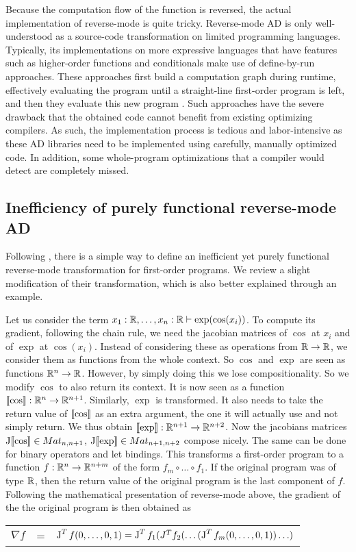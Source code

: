 Because the computation flow of the function is reversed, the actual implementation of reverse-mode is quite tricky. 
Reverse-mode AD is only well-understood as a source-code transformation on limited programming languages. 
Typically, its implementations on more expressive languages that have features such as higher-order functions and conditionals
make use of define-by-run approaches. These approaches first build a computation graph during runtime, effectively evaluating the program until a straight-line
first-order program is left, and then they evaluate this new program \cite{carpenter2015stan,paszke2017automatic}. 
Such approaches have the severe drawback that the obtained code cannot benefit from existing optimizing compilers.
As such, the implementation process is tedious and labor-intensive as these AD libraries need to be implemented using carefully, manually optimized code.
In addition, some whole-program optimizations that a compiler would detect are completely missed.

\subsection{Inefficiency of purely functional reverse-mode AD}

Following \cite{pearlmutter2008reverse}, there is a simple way to define an inefficient yet purely functional reverse-mode transformation for first-order programs.
We review a slight modification of their transformation, which is also better explained through an example. 

Let us consider the term $x_1:\mathbb{R},\ldots,x_n:\mathbb{R}\vdash \exp(\cos(x_i))$.
To compute its gradient, following the chain rule, we need the jacobian matrices of $\cos$ at $x_i$ and of $\exp$ at $\cos(x_i)$. 
Instead of considering these as operations from $\mathbb{R}\to\mathbb{R}$, we consider them as functions from the whole context. So $\cos$ and $\exp$ are seen as functions $\mathbb{R}^n\to\mathbb{R}$.
However, by simply doing this we lose compositionality. 
So we modify $\cos$ to also return its context. It is now seen as a function $\llbracket \cos\rrbracket:\mathbb{R}^n\to\mathbb{R}^{n+1}$.
Similarly, $\exp$ is transformed. It also needs to take the return value of $\llbracket \cos\rrbracket$ as an extra argument, the one it will actually use and not simply return. 
We thus obtain $\llbracket \exp\rrbracket:\mathbb{R}^{n+1}\to\mathbb{R}^{n+2}$. Now the jacobians matrices $\operatorname{J}\llbracket \cos\rrbracket \in Mat_{n,n+1}$, $\operatorname{J}\llbracket \exp\rrbracket \in Mat_{n+1,n+2}$ compose nicely.
The same can be done for binary operators and let bindings.
This transforms a first-order program to a function $f:\mathbb{R}^n\to\mathbb{R}^{n+m}$ of the form $f_m\circ\ldots\circ f_1$. 
If the original program was of type $\mathbb{R}$, then the return value of the original program is the last component of $f$.
Following the mathematical presentation of reverse-mode above, the gradient of the the original program is then obtained as 
\begin{center}
    \begin{tabular}{r c l}
        $\nabla f$ &=& $\operatorname{J}^Tf(0,\ldots,0,1)= \operatorname{J}^Tf_1(J^Tf_{2}(\ldots(\operatorname{J}^Tf_m(0,\ldots,0,1))\ldots)$
    \end{tabular}
\end{center}

